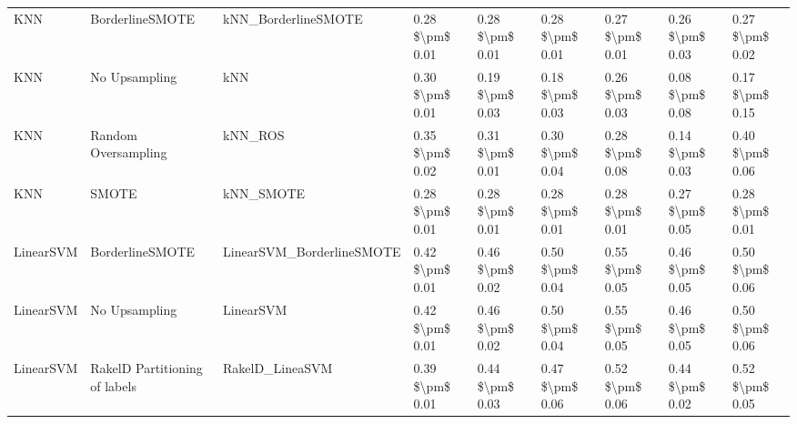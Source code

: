 \begin{tabular}{lllllllll}
                            KNN &               BorderlineSMOTE &                          kNN\_BorderlineSMOTE & 0.28 \$\textbackslash pm\$ 0.01 &           0.28 \$\textbackslash pm\$ 0.01 &       0.28 \$\textbackslash pm\$ 0.01 &        0.27 \$\textbackslash pm\$ 0.01 &                         0.26 \$\textbackslash pm\$ 0.03 &     0.27 \$\textbackslash pm\$ 0.02 \\
                            KNN &                 No Upsampling &                                          kNN & 0.30 \$\textbackslash pm\$ 0.01 &           0.19 \$\textbackslash pm\$ 0.03 &       0.18 \$\textbackslash pm\$ 0.03 &        0.26 \$\textbackslash pm\$ 0.03 &                         0.08 \$\textbackslash pm\$ 0.08 &     0.17 \$\textbackslash pm\$ 0.15 \\
                            KNN &           Random Oversampling &                                      kNN\_ROS & 0.35 \$\textbackslash pm\$ 0.02 &           0.31 \$\textbackslash pm\$ 0.01 &       0.30 \$\textbackslash pm\$ 0.04 &        0.28 \$\textbackslash pm\$ 0.08 &                         0.14 \$\textbackslash pm\$ 0.03 &     0.40 \$\textbackslash pm\$ 0.06 \\
                            KNN &                         SMOTE &                                    kNN\_SMOTE & 0.28 \$\textbackslash pm\$ 0.01 &           0.28 \$\textbackslash pm\$ 0.01 &       0.28 \$\textbackslash pm\$ 0.01 &        0.28 \$\textbackslash pm\$ 0.01 &                         0.27 \$\textbackslash pm\$ 0.05 &     0.28 \$\textbackslash pm\$ 0.01 \\
                      LinearSVM &               BorderlineSMOTE &                    LinearSVM\_BorderlineSMOTE & 0.42 \$\textbackslash pm\$ 0.01 &           0.46 \$\textbackslash pm\$ 0.02 &       0.50 \$\textbackslash pm\$ 0.04 &        0.55 \$\textbackslash pm\$ 0.05 &                         0.46 \$\textbackslash pm\$ 0.05 &     0.50 \$\textbackslash pm\$ 0.06 \\
                      LinearSVM &                 No Upsampling &                                    LinearSVM & 0.42 \$\textbackslash pm\$ 0.01 &           0.46 \$\textbackslash pm\$ 0.02 &       0.50 \$\textbackslash pm\$ 0.04 &        0.55 \$\textbackslash pm\$ 0.05 &                         0.46 \$\textbackslash pm\$ 0.05 &     0.50 \$\textbackslash pm\$ 0.06 \\
                      LinearSVM & RakelD Partitioning of labels &                              RakelD\_LineaSVM & 0.39 \$\textbackslash pm\$ 0.01 &           0.44 \$\textbackslash pm\$ 0.03 &       0.47 \$\textbackslash pm\$ 0.06 &        0.52 \$\textbackslash pm\$ 0.06 &                         0.44 \$\textbackslash pm\$ 0.02 &     0.52 \$\textbackslash pm\$ 0.05 \\

\end{tabular}
